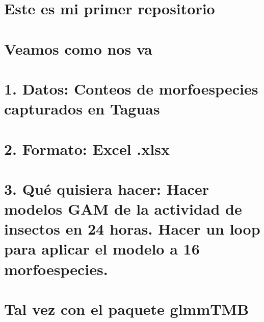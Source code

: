 \documentclass[
]{article}
\author{}
\date{\vspace{-2.5em}}
\begin{document}
\hypertarget{este-es-mi-primer-repositorio}{%
\section{Este es mi primer
repositorio}\label{este-es-mi-primer-repositorio}}

\hypertarget{veamos-como-nos-va}{%
\section{Veamos como nos va}\label{veamos-como-nos-va}}

\hypertarget{datos-conteos-de-morfoespecies-capturados-en-taguas}{%
\section{1. Datos: Conteos de morfoespecies capturados en
Taguas}\label{datos-conteos-de-morfoespecies-capturados-en-taguas}}

\hypertarget{formato-excel-.xlsx}{%
\section{2. Formato: Excel .xlsx}\label{formato-excel-.xlsx}}

\hypertarget{quuxe9-quisiera-hacer-hacer-modelos-gam-de-la-actividad-de-insectos-en-24-horas.-hacer-un-loop-para-aplicar-el-modelo-a-16-morfoespecies.}{%
\section{3. Qué quisiera hacer: Hacer modelos GAM de la actividad de
insectos en 24 horas. Hacer un loop para aplicar el modelo a 16
morfoespecies.}\label{quuxe9-quisiera-hacer-hacer-modelos-gam-de-la-actividad-de-insectos-en-24-horas.-hacer-un-loop-para-aplicar-el-modelo-a-16-morfoespecies.}}

\hypertarget{tal-vez-con-el-paquete-glmmtmb}{%
\section{Tal vez con el paquete
glmmTMB}\label{tal-vez-con-el-paquete-glmmtmb}}
\end{document}
